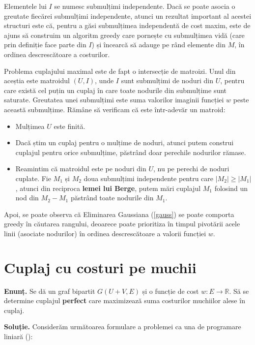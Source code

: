 Elementele lui $I$ se numesc submulțimi independente. Dacă se poate asocia o greutate fiecărei submulțimi independente, atunci un rezultat
important al acestei structuri este că, pentru a găsi submulțimea independentă de cost maxim, este de ajuns să construim un algoritm greedy
care pornește cu submulțimea vidă (care prin definiție face parte din $I$) și încearcă să adauge pe rând elemente din $M$, în ordinea descrescătoare
a costurilor.

Problema cuplajului maximal este de fapt o intersecție de matroizi. Unul din aceștia este matroidul $(U, I)$, unde $I$ sunt submulțimi de noduri
din $U$, pentru care există cel puțin un cuplaj în care toate nodurile din submulțime sunt saturate. Greutatea unei submulțimi este suma valorilor
imaginii funcției $w$ peste această submulțime. Rămâne să verificam că este într-adevăr un matroid:

\begin{itemize}
  \item Mulțimea $U$ este finită.
  \item Dacă știm un cuplaj pentru o mulțime de noduri, atunci putem construi cuplajul pentru orice submulțime, păstrând doar perechile nodurilor
  rămase.
  \item Reamintim că matroidul este pe noduri din $U$, nu pe perechi de noduri cuplate. Fie $M_{1}$ și $M_{2}$ doua submulțimi independente pentru care
    $|M_{2}| \geq |M_{1}|$, atunci din reciproca \textbf{lemei lui Berge}, putem mări cuplajul $M_{1}$ folosind un nod din $M_{2} - M_{1}$ păstrând
    toate nodurile din $M_{1}$.
\end{itemize}

Apoi, se poate observa că Eliminarea Gaussiana (\ref{gauss}) se poate comporta greedy în căutarea rangului, deoarece poate prioritiza în timpul pivotării
acele linii (asociate nodurilor) în ordinea descrescătoare a valorii funcției $w$.

\pagebreak

\section{Cuplaj cu costuri pe muchii}\label{mincostmatching}

\noindent \textbf{Enunț.} Se dă un graf bipartit $G(U + V, E)$ și o funcție de cost $w \colon E \to \mathbb{R}$. Să se determine cuplajul
\textbf{perfect} care maximizează suma costurilor muchiilor alese în cuplaj.

\noindent \textbf{Soluție.} Considerăm următoarea formulare a problemei ca una de programare liniară (\cite{assignmentlp}):

